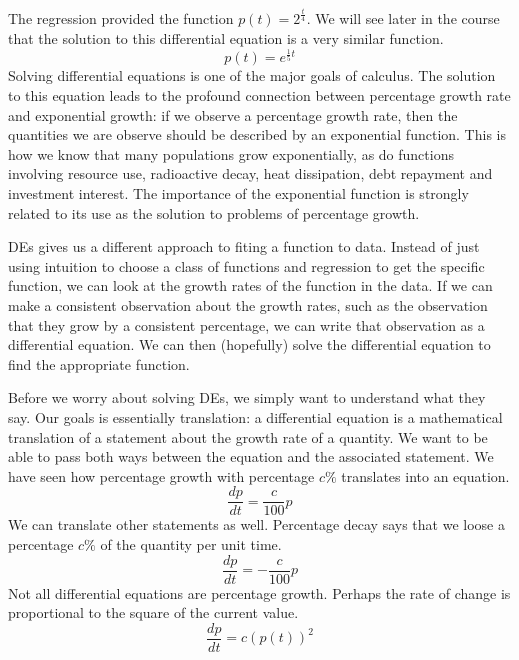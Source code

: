 \documentclass[fleqn]{report}
\begin{document}
The regression provided the function $p(t) = 2^{\frac{t}{4}}$.
We will see later in the course that the solution to this
differential equation is a very similar function.
\begin{equation*}
p(t) = e^{\frac{1}{5} t}
\end{equation*}
Solving differential equations is one of the major goals of
calculus. The solution to this equation leads to the profound
connection between percentage growth rate and exponential
growth: if we observe a percentage growth rate, then the
quantities we are observe should be described by an
exponential function. This is how we know that many
populations grow exponentially, as do functions involving
resource use, radioactive decay, heat dissipation, debt
repayment and investment interest. The importance of the
exponential function is strongly related to its use as the
solution to problems of percentage growth.

DEs gives us a different approach to fiting a function to
data. Instead of just using intuition to choose a class of
functions and regression to get the specific function, we can
look at the growth rates of the function in the data. If we
can make a consistent observation about the growth rates, such
as the observation that they grow by a consistent percentage,
we can write that observation as a differential equation. We
can then (hopefully) solve the differential equation to find
the appropriate function.

Before we worry about solving DEs, we simply want to understand
what they say. Our goals is essentially translation: a
differential equation is a mathematical translation of a
statement about the growth rate of a quantity. We want to be
able to pass both ways between the equation and the associated
statement. We have seen how percentage growth with percentage
$c\%$ translates into an equation.
\begin{equation*}
\frac{dp}{dt} = \frac{c}{100} p
\end{equation*}
We can translate other statements as well. Percentage decay
says that we loose a percentage $c\%$ of the quantity per unit
time. 
\begin{equation*}
\frac{dp}{dt} = -\frac{c}{100} p
\end{equation*}
Not all differential equations are percentage growth. Perhaps
the rate of change is proportional to the square of the
current value. 
\begin{equation*}
\frac{dp}{dt} = c(p(t))^2
\end{equation*}
\end{document}
